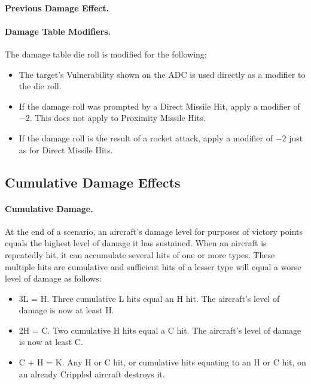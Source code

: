 \paragraph{Previous Damage Effect.} 

\paragraph{Damage Table Modifiers.} The damage table die roll is modified for the following:

\begin{itemize}

    \item{} The target's Vulnerability shown on the ADC is used directly as a modifier to the die roll.
    
    \item{} If the damage roll was prompted by a Direct Missile Hit, apply a modifier of $-2$. This does not apply to Proximity Missile Hits.
    
    \item{} If the damage roll is the result of a rocket attack, apply a modifier of $-2$ just as for Direct Missile Hits.
    
\end{itemize}

\subsection{Cumulative Damage Effects}

\paragraph{Cumulative Damage.} At the end of a scenario, an aircraft's damage level for purposes of victory points equals the highest level of damage it has sustained. When an aircraft is repeatedly hit, it can accumulate several hits of one or more types. These multiple hits are cumulative and sufficient hits of a lesser type will equal a worse level of damage as follows:

\begin{itemize}

    \item 3L = H. Three cumulative L hits equal an H hit. The aircraft's level of damage is now at least H.

    \item 2H = C. Two cumulative H hits equal a C hit. The aircraft's level of damage is now at least C.

    \item C + H = K. Any H or C hit, or cumulative hits equating to an H or C hit, on an already Crippled aircraft destroys it.
    
\end{itemize}

